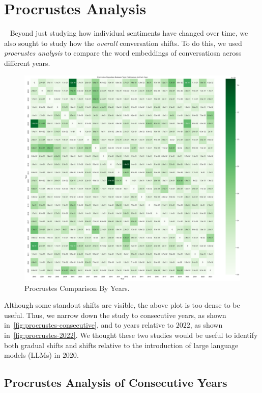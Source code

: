 \section{Procrustes Analysis}~\label{sec:procrustes}
Beyond just studying how individual sentiments have changed over time,
we also sought to study how the \emph{overall} conversation shifts.
To do this, we used \emph{procrustes analysis} to compare the
word embeddings of conversatiosn across different years.

\begin{figure}[H]
  \centering
  \includegraphics[width=\textwidth]{figures/procrustes/heatmap.png}
  \caption{Procrustes Comparison By Years.}
  \label{fig:procrustes-heatmap}
\end{figure}

Although some standout shifts are visible, the above plot is too dense to be useful.
Thus, we narrow down the study to consecutive years, as shown in~\cref{fig:procrustes-consecutive},
and to years relative to $2022$, as shown in~\cref{fig:procrustes-2022}.
We thought these two studies would be useful to identify both gradual shifts
and shifts relative to the introduction of large language models (LLMs)
in $2020$.

\subsection{Procrustes Analysis of Consecutive Years}~\label{subsec:procrustes-consecutive}

